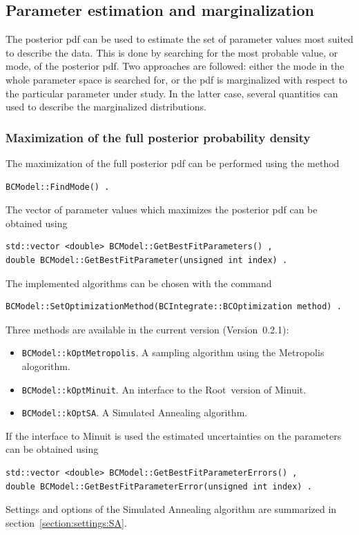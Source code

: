 \documentclass[11pt, a4paper]{article}
\newcommand{\Root}{{\sc Root}}
\newcommand{\versionno}{0.2.1}
\newcommand{\Version}{Version~\versionno}
\begin{document}

\subsection{Parameter estimation and marginalization} 

The posterior pdf can be used to estimate the set of parameter values
most suited to describe the data. This is done by searching for the
most probable value, or mode, of the posterior pdf. Two approaches are
followed: either the mode in the whole parameter space is searched
for, or the pdf is marginalized with respect to the particular
parameter under study. In the latter case, several quantities can used
to describe the marginalized distributions.


\subsubsection{Maximization of the full posterior probability density} 

The maximization of the full posterior pdf can be performed using the
method
%
\begin{verbatim} 
BCModel::FindMode() . 
\end{verbatim} 

\noindent 
The vector of parameter values which maximizes the posterior pdf can be obtained using 
%
\begin{verbatim}
std::vector <double> BCModel::GetBestFitParameters() , 
double BCModel::GetBestFitParameter(unsigned int index) .
\end{verbatim}
%
The implemented algorithms can be chosen with the command
%
\begin{verbatim}
BCModel::SetOptimizationMethod(BCIntegrate::BCOptimization method) .
\end{verbatim}
%
Three methods are available in the current version (\Version): 
%
\begin{itemize}
\item \verb|BCModel::kOptMetropolis|. A sampling algorithm using the
  Metropolis alogorithm.
\item \verb|BCModel::kOptMinuit|. An interface to the \Root\ version
  of Minuit.
\item \verb|BCModel::kOptSA|. A Simulated Annealing algorithm. 
\end{itemize}
%
If the interface to Minuit is used the estimated uncertainties on the
parameters can be obtained using
%
\begin{verbatim}
std::vector <double> BCModel::GetBestFitParameterErrors() , 
double BCModel::GetBestFitParameterError(unsigned int index) . 
\end{verbatim}
%
Settings and options of the Simulated Annealing algorithm are
summarized in section~\ref{section:settings:SA}.
\end{document}
